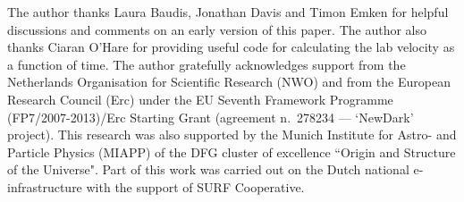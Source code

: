 \documentclass[prd,twocolumn,showpacs,nofootinbib,aps]{revtex4-1}
\begin{document}


\acknowledgements

The author thanks Laura Baudis, Jonathan Davis and Timon Emken for helpful discussions and comments on an early version of this paper. The author also thanks Ciaran O'Hare for providing useful code for calculating the lab velocity as a function of time. The author gratefully acknowledges support from the Netherlands Organisation for Scientific Research (NWO) and from the European Research Council ({\sc Erc}) under the EU Seventh Framework Programme (FP7/2007-2013)/{\sc Erc} Starting Grant (agreement n.\ 278234 --- `{\sc NewDark}' project).
This research was also supported by the Munich Institute for Astro- and Particle Physics (MIAPP) of the DFG cluster of excellence ``Origin and Structure of the Universe".
Part of this work was carried out on the Dutch national e-infrastructure with the support of SURF Cooperative.


\end{document}
